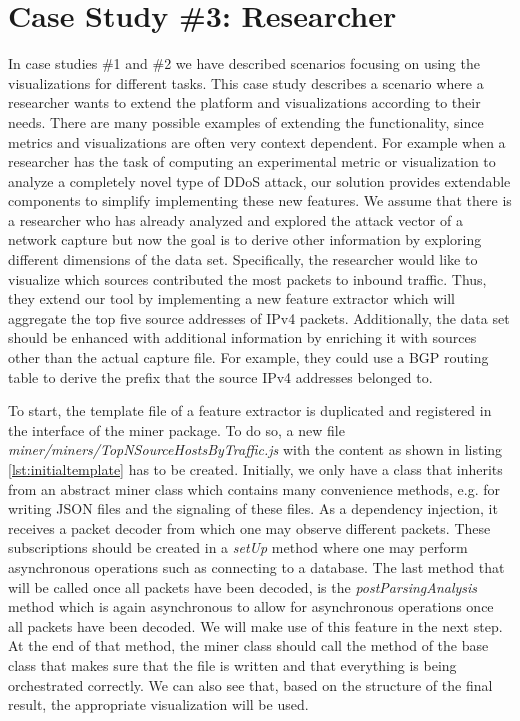 \section{Case Study \#3: Researcher} \label{casestudyresearcher}
In case studies \#1 and \#2 we have described scenarios focusing on using the visualizations for different tasks. This case study describes a scenario where a researcher wants to extend the platform and visualizations according to their needs. There are many possible examples of extending the functionality, since metrics and visualizations are often very context dependent. For example when a researcher has the task of computing an experimental metric or visualization to analyze a completely novel type of DDoS attack, our solution provides  extendable components to simplify implementing these new features.  We assume that there is a researcher who has already analyzed and explored the attack vector of a network capture but now the goal is to derive other information by exploring different dimensions of the data set. Specifically, the researcher would like to visualize which sources contributed the most packets to inbound traffic. Thus, they extend our tool by implementing a new feature extractor which will aggregate the top five source addresses of IPv4 packets. Additionally, the data set should be enhanced with additional information by enriching it with sources other than the actual capture file. For example, they could use a BGP routing table to derive the prefix that the source IPv4 addresses belonged to.

To start, the template file of a feature extractor is duplicated and registered in the interface of the miner package. To do so, a new file \textit{miner/miners/TopNSourceHostsByTraffic.js} with the content as shown in listing \ref{lst:initialtemplate} has to be created.
Initially, we only have a class that inherits from an abstract miner class which contains many convenience methods, e.g. for writing JSON files and the signaling of these files. As a dependency injection, it receives a packet decoder from which one may observe different packets. These subscriptions should be created in a \textit{setUp} method where one may perform asynchronous operations such as connecting to a database. The last method that will be called once all packets have been decoded, is the \textit{postParsingAnalysis} method which is again asynchronous to allow for asynchronous operations once all packets have been decoded. We will make use of this feature in the next step. At the end of that method, the miner class should call the method of the base class that makes sure that the file is written and that everything is being orchestrated correctly. We can also see that, based on the structure of the final result, the appropriate visualization will be used.



